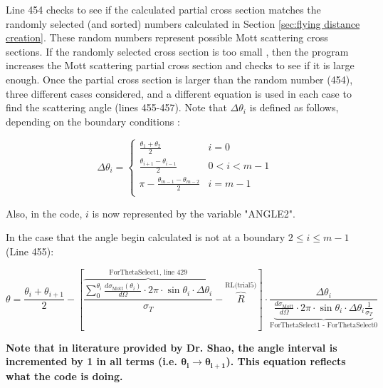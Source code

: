 \documentclass[10pt, reqno]{exam}
\begin{document}
Line 454 checks to see if the calculated partial cross section matches the randomly selected (and sorted) numbers calculated in Section \ref{sec:flying distance creation}. These random numbers represent possible Mott scattering cross sections. If the randomly selected cross section is too small , then the program increases the Mott scattering partial cross section and checks to see if it is large enough. Once the partial cross section is larger than the random number (454), three different cases considered, and a different equation is used in each case to find the scattering angle (lines 455-457). Note that $\Delta \theta_{i}$ is defined as follows, depending on the boundary conditions : \par

\begin{equation}
    \Delta \theta_i = \begin{cases}
        \frac{\theta_{1} + \theta_{2}}{2} &i = 0 \\
        \frac{\theta_{i + 1} - \theta_{i - 1}}{2} &0 < i < m - 1 \\
        \pi - \frac{\theta_{m - 1} - \theta_{m - 2}}{2} &i = m - 1 \\
    \end{cases}
\end{equation}

Also, in the code, $i$ is now represented by the variable "ANGLE2".\par

In the case that the angle begin calculated is not at a boundary $2 \le i \le m - 1$ (Line 455): \par

\begin{equation}
        \theta = \frac{\theta_{i} + \theta_{i + 1}}{2} - \left[ \overbrace{\boxed{\frac{\sum_0^{\theta_{i}}\frac{d\sigma_{\text{Mott}}(\theta_{i})}{d\Omega}\cdot 2\pi\cdot \sin\theta_{i}\cdot \Delta \theta_{i}}{\sigma_T}}}^{\text{ForThetaSelect1, line 429}} - \overbrace{\boxed{R}}^{\text{RL(trial5)}} \right]\cdot \frac{\Delta \theta_{i}}{\underbrace{\boxed{\frac{d\sigma_{\text{Mott}}}{d\Omega} \cdot 2\pi \cdot\sin\theta_{i}\cdot \Delta \theta_{i}\frac{1}{\sigma_T}}}_{\text{ForThetaSelect1 - ForThetaSelect0}}}
\end{equation}

\textbf{Note that in literature provided by Dr. Shao, the angle interval is incremented by 1 in all terms (i.e. $\bm{\theta_i \rightarrow \theta_{i + 1}}$). This equation reflects what the code is doing.} \par
\end{document}
